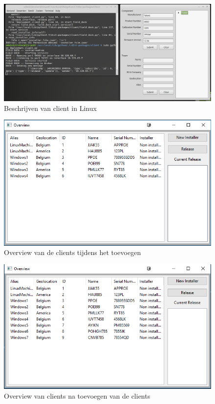 \begin{figure}
\centering
\includegraphics[width=\textwidth,height=\textheight,keepaspectratio]{afbeelding/testMultiClient/beschrijvenTorenLinux_cut.png}
\caption{Beschrijven van client in Linux}
\label{fig:testClient:linuxBeschrijving}
\end{figure}

\begin{figure}[!ht]
\centering
\includegraphics[scale=0.9]{afbeelding/testMultiClient/overview1.png}
\caption{Overview van de clients tijdens het toevoegen}
\label{fig:testClient:overviewTijdensToevoegen}
\end{figure}

\begin{figure}[!ht]
\centering
\includegraphics[scale=0.9]{afbeelding/testMultiClient/beforeRelease.png}
\caption{Overview van clients na toevoegen van de clients}
\label{fig:testClient:setup}
\end{figure}

